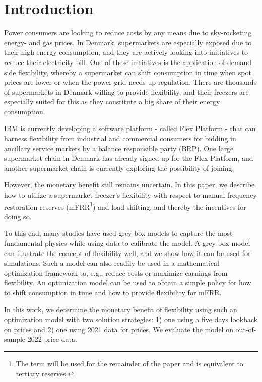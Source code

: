 \section{Introduction}

Power consumers are looking to reduce costs by any means due to sky-rocketing energy- and gas prices. In Denmark, supermarkets are especially exposed due to their high energy consumption, and they are actively looking into initiatives to reduce their electricity bill. One of these initiatives is the application of demand-side flexibility, whereby a supermarket can shift consumption in time when spot prices are lower or when the power grid needs up-regulation. There are thousands of supermarkets in Denmark willing to provide flexibility, and their freezers are especially suited for this as they constitute a big share of their energy consumption.

IBM is currently developing a software platform - called Flex Platform - that can harness flexibility from industrial and commercial consumers for bidding in ancillary service markets by a balance responsible party (BRP). One large supermarket chain in Denmark has already signed up for the Flex Platform, and another supermarket chain is currently exploring the possibility of joining.

However, the monetary benefit still remains uncertain. In this paper, we describe how to utilize a supermarket freezer's flexibility with respect to manual frequency restoration reserves (mFRR\footnote{The term will be used for the remainder of the paper and is equivalent to tertiary reserves.}) and load shifting, and thereby the incentives for doing so.

To this end, many studies have used grey-box models to capture the most fundamental physics while using data to calibrate the model. A grey-box model can illustrate the concept of flexibility well, and we show how it can be used for simulations. Such a model can also readily be used in a mathematical optimization framework to, e.g., reduce costs or maximize earnings from flexibility. An optimization model can be used to obtain a simple policy for how to shift consumption in time and how to provide flexibility for mFRR.

In this work, we determine the monetary benefit of flexibility using such an optimization model with two solution strategies: 1) one using a five days lookback on prices and 2) one using 2021 data for prices. We evaluate the model on out-of-sample 2022 price data.

